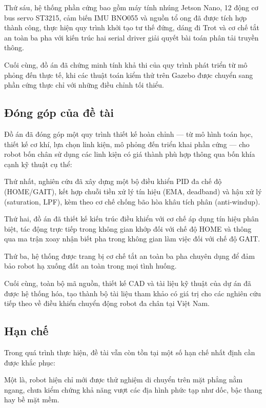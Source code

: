 Thứ sáu, hệ thống phần cứng bao gồm máy tính nhúng Jetson Nano, 12 động cơ bus servo ST3215, cảm biến IMU BNO055 và nguồn tổ ong đã được tích hợp thành công, thực hiện quy trình khởi tạo tư thế đứng, dáng đi Trot và cơ chế tắt an toàn ba pha với kiến trúc hai serial driver giải quyết bài toán phân tải truyền thông. 

Cuối cùng, đồ án đã chứng minh tính khả thi của quy trình phát triển từ mô phỏng đến thực tế, khi các thuật toán kiểm thử trên Gazebo được chuyển sang phần cứng thực chỉ với những điều chỉnh tối thiểu.

\subsection{Đóng góp của đề tài}

Đồ án đã đóng góp một quy trình thiết kế hoàn chỉnh --- từ mô hình toán học, thiết kế cơ khí, lựa chọn linh kiện, mô phỏng đến triển khai phần cứng --- cho robot bốn chân sử dụng các linh kiện có giá thành phù hợp thông qua bốn khía cạnh kỹ thuật cụ thể:

Thứ nhất, nghiên cứu đã xây dựng một bộ điều khiển PID đa chế độ (HOME/GAIT), kết hợp chuỗi tiền xử lý tín hiệu (EMA, deadband) và hậu xử lý (saturation, LPF), kèm theo cơ chế chống bão hòa khâu tích phân (anti-windup). 

Thứ hai, đồ án đã thiết kế kiến trúc điều khiển với cơ chế áp dụng tín hiệu phân biệt, tác động trực tiếp trong không gian khớp đối với chế độ HOME và thông qua ma trận xoay nhận biết pha trong không gian làm việc đối với chế độ GAIT. 

Thứ ba, hệ thống được trang bị cơ chế tắt an toàn ba pha chuyên dụng để đảm bảo robot hạ xuống đất an toàn trong mọi tình huống. 

Cuối cùng, toàn bộ mã nguồn, thiết kế CAD và tài liệu kỹ thuật của dự án đã được hệ thống hóa, tạo thành bộ tài liệu tham khảo có giá trị cho các nghiên cứu tiếp theo về điều khiển chuyển động robot đa chân tại Việt Nam.

\subsection{Hạn chế}

Trong quá trình thực hiện, đề tài vẫn còn tồn tại một số hạn chế nhất định cần được khắc phục:

Một là, robot hiện chỉ mới được thử nghiệm di chuyển trên mặt phẳng nằm ngang, chưa kiểm chứng khả năng vượt các địa hình phức tạp như dốc, bậc thang hay bề mặt mềm. 

